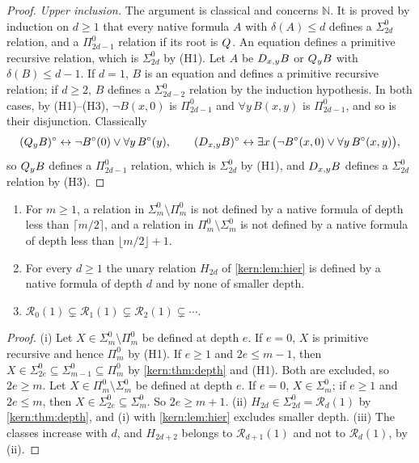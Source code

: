 \begin{proof}
\emph{Upper inclusion.}  The argument is classical and concerns
$\mathbb N$.  It is proved by induction on $d\ge1$ that every native formula
$A$ with $\delta(A)\le d$ defines a $\Sigma^0_{2d}$ relation, and a
$\Pi^0_{2d-1}$ relation if its root is $Q_{}$.  An equation defines a
primitive recursive relation, which is $\Sigma^0_{2d}$ by (H1).  Let $A$ be
$D_{x,y}B$ or $Q_{y}B$ with $\delta(B)\le d-1$.  If $d=1$, $B$ is an
equation and defines a primitive recursive relation; if $d\ge2$, $B$
defines a $\Sigma^0_{2d-2}$ relation by the induction hypothesis.  In both
cases, by (H1)--(H3), $\neg B(x,0)$ is $\Pi^0_{2d-1}$ and $\forall y\,B(x,y)$
is $\Pi^0_{2d-1}$, and so is their disjunction.  Classically
\[
 (Q_{y}B)^\circ\leftrightarrow\neg B^\circ(0)\vee\forall y\,B^\circ(y),
 \qquad
 (D_{x,y}B)^\circ\leftrightarrow
 \exists x\,\bigl(\neg B^\circ(x,0)\vee\forall y\,B^\circ(x,y)\bigr),
\]
so $Q_{y}B$ defines a $\Pi^0_{2d-1}$ relation, which is $\Sigma^0_{2d}$ by
(H1), and $D_{x,y}B$ defines a $\Sigma^0_{2d}$ relation by (H3).
\end{proof}

\begin{corollary}
\label{kern:cor:depthstrict}
\begin{enumerate}[label=\textup{(\roman*)}]
\item For $m\ge1$, a relation in $\Sigma^0_m\setminus\Pi^0_m$ is not
 defined by a native formula of depth less than $\lceil m/2\rceil$, and a
 relation in $\Pi^0_m\setminus\Sigma^0_m$ is not defined by a native formula
 of depth less than $\lfloor m/2\rfloor+1$.
\item For every $d\ge1$ the unary relation $H_{2d}$ of \cref{kern:lem:hier}
 is defined by a native formula of depth $d$ and by none of smaller depth.
\item $\mathcal R_0(1)\subsetneq\mathcal R_1(1)\subsetneq\mathcal R_2(1)
 \subsetneq\cdots$.
\end{enumerate}
\end{corollary}

\begin{proof}
(i) Let $X\in\Sigma^0_m\setminus\Pi^0_m$ be defined at depth $e$.  If
$e=0$, $X$ is primitive recursive and hence $\Pi^0_m$ by (H1).  If $e\ge1$
and $2e\le m-1$, then $X\in\Sigma^0_{2e}\subseteq\Sigma^0_{m-1}
\subseteq\Pi^0_m$ by \cref{kern:thm:depth} and (H1).  Both are excluded, so
$2e\ge m$.  Let $X\in\Pi^0_m\setminus\Sigma^0_m$ be defined at depth $e$.  If
$e=0$, $X\in\Sigma^0_m$; if $e\ge1$ and $2e\le m$, then
$X\in\Sigma^0_{2e}\subseteq\Sigma^0_m$.  So $2e\ge m+1$.
(ii) $H_{2d}\in\Sigma^0_{2d}=\mathcal R_d(1)$ by \cref{kern:thm:depth}, and
(i) with \cref{kern:lem:hier} excludes smaller depth.
(iii) The classes increase with $d$, and $H_{2d+2}$ belongs to
$\mathcal R_{d+1}(1)$ and not to $\mathcal R_d(1)$, by (ii).
\end{proof}

